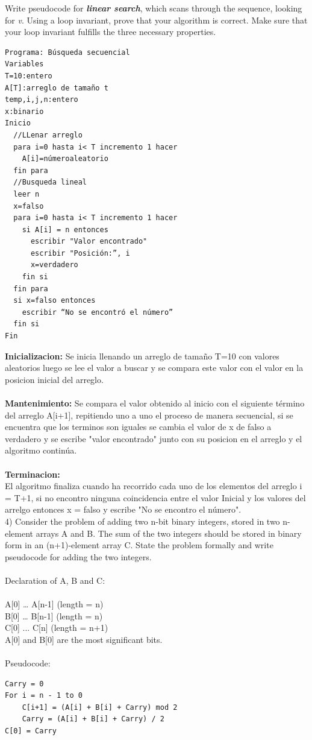 \documentclass[a4paper]{article}
\begin{document}
Write pseudocode for \textbf{\textit{linear search}}, which scans through the sequence, looking for \textit{v}. Using a loop invariant, prove that your algorithm is correct. Make sure that your loop invariant fulfills the three necessary properties. 
\begin{verbatim}
Programa: Búsqueda secuencial
Variables
T=10:entero
A[T]:arreglo de tamaño t
temp,i,j,n:entero
x:binario
Inicio
  //LLenar arreglo
  para i=0 hasta i< T incremento 1 hacer
    A[i]=númeroaleatorio
  fin para
  //Busqueda lineal
  leer n
  x=falso
  para i=0 hasta i< T incremento 1 hacer
    si A[i] = n entonces
      escribir "Valor encontrado"
      escribir "Posición:”, i
      x=verdadero
    fin si
  fin para
  si x=falso entonces
    escribir “No se encontró el número”
  fin si
Fin
\end{verbatim}
\textbf{Inicializacion:}
Se  inicia llenando un arreglo de tamaño T=10 con valores aleatorios luego se lee el valor a buscar y se compara este valor con el valor en la posicion inicial del arreglo.\\\\
\textbf{Mantenimiento:}
Se compara el valor obtenido al inicio con el siguiente término del arreglo A[i+1], repitiendo uno a uno el proceso de manera secuencial, si se encuentra que los terminos son iguales se cambia el valor de x de falso a verdadero y se escribe "valor encontrado" junto con su posicion en el arreglo y el algoritmo continúa. \\\\
\textbf{Terminacion:}\\
El algoritmo finaliza cuando ha recorrido cada uno de los elementos del arreglo i = T+1, si no encontro ninguna coincidencia entre el valor Inicial y los valores del arrelgo entonces x = falso y escribe "No se encontro el número".
\[\]
4)
Consider the problem of adding two n-bit binary integers, stored in two n-element arrays A and B. The sum of the two integers should be stored in binary form in an (n+1)-element array C. State the problem formally and write pseudocode for adding the two integers.\\\\
Declaration of A, B and C:\\\\
A[0] … A[n-1] (length = n)\\
B[0] … B[n-1] (length = n)\\
C[0] ... C[n] (length = n+1)\\
A[0] and B[0] are the most significant bits.\\\\
Pseudocode:\\

\begin{verbatim}
Carry = 0
For i = n - 1 to 0
    C[i+1] = (A[i] + B[i] + Carry) mod 2
    Carry = (A[i] + B[i] + Carry) / 2
C[0] = Carry
\end{verbatim}
 
\end{document}
